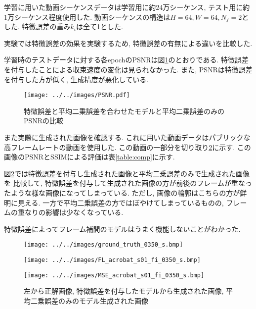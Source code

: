 \documentclass[twocolumn,a4j,uplatex]{jsarticle}
\begin{document}
学習に用いた動画シーケンスデータは学習用に約24万シーケンス, テスト用に約1万シーケンス程度使用した.
動画シーケンスの構造は$H=64, W=64, N_f=2$とした.
特徴誤差の重み$k_i$は全て1とした.

実験では特徴誤差の効果を実験するため, 特徴誤差の有無による違いを比較した.

学習時のテストデータに対する各epochのPSNRは図\ref{fig:PSNR}のとおりである.
特徴誤差を付与したことによる収束速度の変化は見られなかった.
また, PSNRは特徴誤差を付与した方が低く, 生成精度が悪化している.

\begin{figure}[htbp]
    \centering
    \texttt{[image: ../../images/PSNR.pdf]}
    \caption{特徴誤差と平均二乗誤差を合わせたモデルと平均二乗誤差のみのPSNRの比較}
    \label{fig:PSNR}
\end{figure}

また実際に生成された画像を確認する. これに用いた動画データはパブリックな高フレームレートの動画\cite{air}を使用した.
この動画の一部分を切り取り\ref{fig:pic}に示す.
この画像のPSNRとSSIMによる評価は表\ref{table:comp}に示す.

図\ref{fig:pic}では特徴誤差を付与し生成された画像と平均二乗誤差のみで生成された画像を
比較して, 特徴誤差を付与して生成された画像の方が前後のフレームが重なったような様な画像になってしまっている.
ただし, 画像の輪郭はこちらの方が鮮明に見える.
一方で平均二乗誤差の方ではぼやけてしまっているものの, フレームの重なりの影響は少なくなっている.

特徴誤差によってフレーム補間のモデルはうまく機能しないことがわかった.

\begin{figure}[htbp]
    \centering
    \begin{minipage}{0.3\hsize}
        \centering
        \texttt{[image: ../../images/ground\_truth\_0350\_s.bmp]}
    \end{minipage}
    \begin{minipage}{0.3\columnwidth}
        \centering
        \texttt{[image: ../../images/FL\_acrobat\_s01\_fi\_0350\_s.bmp]}
    \end{minipage}
    \begin{minipage}{0.3\columnwidth}
        \centering
        \texttt{[image: ../../images/MSE\_acrobat\_s01\_fi\_0350\_s.bmp]}
    \end{minipage}
    \caption{左から正解画像, 特徴誤差を付与したモデルから生成された画像, 平均二乗誤差のみのモデル生成された画像}
    \label{fig:pic}
\end{figure}
\end{document}

